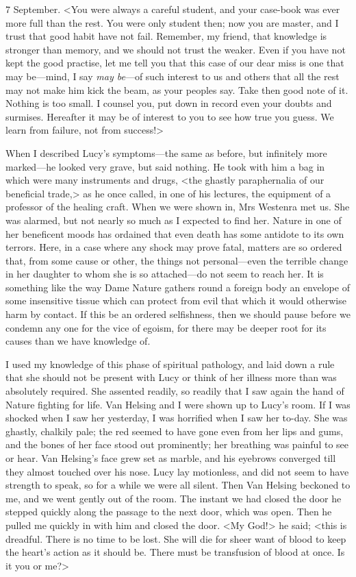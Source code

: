 \begin{diary}{7 September.}
<You were always a careful student, and your case-book was ever more full than the rest. You were only student then; now you are master, and I trust that good habit have not fail. Remember, my friend, that knowledge is stronger than memory, and we should not trust the weaker. Even if you have not kept the good practise, let me tell you that this case of our dear miss is one that may be—mind, I say \textit{may be}—of such interest to us and others that all the rest may not make him kick the beam, as your peoples say. Take then good note of it. Nothing is too small. I counsel you, put down in record even your doubts and surmises. Hereafter it may be of interest to you to see how true you guess. We learn from failure, not from success!>

When I described Lucy's symptoms—the same as before, but infinitely more marked—he looked very grave, but said nothing. He took with him a bag in which were many instruments and drugs, <the ghastly paraphernalia of our beneficial trade,> as he once called, in one of his lectures, the equipment of a professor of the healing craft. When we were shown in, Mrs Westenra met us. She was alarmed, but not nearly so much as I expected to find her. Nature in one of her beneficent moods has ordained that even death has some antidote to its own terrors. Here, in a case where any shock may prove fatal, matters are so ordered that, from some cause or other, the things not personal—even the terrible change in her daughter to whom she is so attached—do not seem to reach her. It is something like the way Dame Nature gathers round a foreign body an envelope of some insensitive tissue which can protect from evil that which it would otherwise harm by contact. If this be an ordered selfishness, then we should pause before we condemn any one for the vice of egoism, for there may be deeper root for its causes than we have knowledge of.

I used my knowledge of this phase of spiritual pathology, and laid down a rule that she should not be present with Lucy or think of her illness more than was absolutely required. She assented readily, so readily that I saw again the hand of Nature fighting for life. Van Helsing and I were shown up to Lucy's room. If I was shocked when I saw her yesterday, I was horrified when I saw her to-day. She was ghastly, chalkily pale; the red seemed to have gone even from her lips and gums, and the bones of her face stood out prominently; her breathing was painful to see or hear. Van Helsing's face grew set as marble, and his eyebrows converged till they almost touched over his nose. Lucy lay motionless, and did not seem to have strength to speak, so for a while we were all silent. Then Van Helsing beckoned to me, and we went gently out of the room. The instant we had closed the door he stepped quickly along the passage to the next door, which was open. Then he pulled me quickly in with him and closed the door. <My God!> he said; <this is dreadful. There is no time to be lost. She will die for sheer want of blood to keep the heart's action as it should be. There must be transfusion of blood at once. Is it you or me?>


\end{diary}
